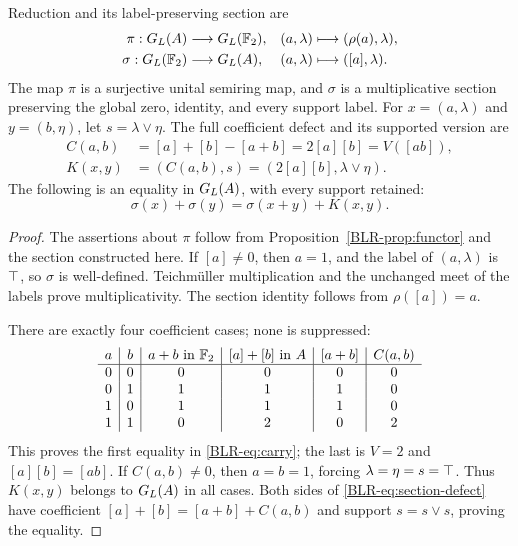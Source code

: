 \begin{theorem}\label{BLR-thm:section}
Reduction and its label-preserving section are
\begin{align*}
 \pi:G_L(A)&\longrightarrow G_L(\mathbb F_2),
 &(a,\lambda)&\longmapsto(\rho(a),\lambda),\\
 \sigma:G_L(\mathbb F_2)&\longrightarrow G_L(A),
 &(a,\lambda)&\longmapsto([a],\lambda).
\end{align*}
The map $\pi$ is a surjective unital semiring map, and $\sigma$ is a
multiplicative section preserving the global zero, identity, and every
support label. For $x=(a,\lambda)$ and $y=(b,\eta)$, let
$s=\lambda\vee\eta$. The full coefficient defect and its supported
version are
\begin{align}
 C(a,b)&=[a]+[b]-[a+b]=2[a][b]=V([ab]),\label{BLR-eq:carry}\\
 K(x,y)&=(C(a,b),s)=(2[a][b],\lambda\vee\eta).\label{BLR-eq:supported-carry}
\end{align}
The following is an equality in $G_L(A)$, with every support retained:
\begin{equation}\label{BLR-eq:section-defect}
 \sigma(x)+\sigma(y)=\sigma(x+y)+K(x,y).
\end{equation}
\end{theorem}
\begin{proof}
The assertions about $\pi$ follow from Proposition~\ref{BLR-prop:functor}
and the section constructed here. If $[a]\ne0$, then $a=1$, and the
label of $(a,\lambda)$ is $\top$, so $\sigma$ is well-defined.
Teichm\"uller multiplication and the unchanged meet of the labels prove
multiplicativity. The section identity follows from $\rho([a])=a$.

There are exactly four coefficient cases; none is suppressed:
\[
\begin{array}{c|c|c|c|c|c}
 a&b&a+b\text{ in }\mathbb F_2&[a]+[b]\text{ in }A&[a+b]&C(a,b)\\\hline
 0&0&0&0&0&0\\
 0&1&1&1&1&0\\
 1&0&1&1&1&0\\
 1&1&0&2&0&2
\end{array}
\]
This proves the first equality in \eqref{BLR-eq:carry}; the last is
$V=2$ and $[a][b]=[ab]$. If $C(a,b)\ne0$, then $a=b=1$, forcing
$\lambda=\eta=s=\top$. Thus $K(x,y)$ belongs to $G_L(A)$ in all
cases. Both sides of \eqref{BLR-eq:section-defect} have coefficient
$[a]+[b]=[a+b]+C(a,b)$ and support $s=s\vee s$, proving the equality.
\end{proof}

